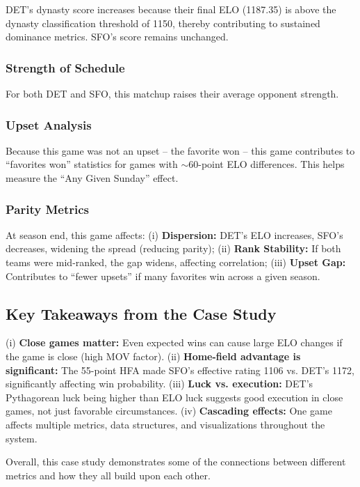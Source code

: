 \documentclass[a4paper,10.5pt,twoside]{article}
\begin{document}
DET's dynasty score increases because their final ELO (1187.35) is above the dynasty classification threshold of 1150, thereby contributing to sustained dominance metrics. SFO's score remains unchanged.

\subsubsection{Strength of Schedule}

For both DET and SFO, this matchup raises their average opponent strength. 

\subsubsection{Upset Analysis}

Because this game was not an upset -- the favorite won -- this game contributes to ``favorites won'' statistics for games with $\sim 60$-point ELO differences. This helps measure the ``Any Given Sunday'' effect.

\subsubsection{Parity Metrics}

At season end, this game affects:  
(i) \textbf{Dispersion:} DET's ELO increases, SFO's decreases, widening the spread (reducing parity);  
(ii) \textbf{Rank Stability:} If both teams were mid-ranked, the gap widens, affecting correlation;  
(iii) \textbf{Upset Gap:} Contributes to ``fewer upsets'' if many favorites win across a given season.

\subsection{Key Takeaways from the Case Study}

(i) \textbf{Close games matter:} Even expected wins can cause large ELO changes if the game is close (high MOV factor).  
(ii) \textbf{Home-field advantage is significant:} The 55-point HFA made SFO’s effective rating 1106 vs. DET’s 1172, significantly affecting win probability.  
(iii) \textbf{Luck vs. execution:} DET’s Pythagorean luck being higher than ELO luck suggests good execution in close games, not just favorable circumstances.  
(iv) \textbf{Cascading effects:} One game affects multiple metrics, data structures, and visualizations throughout the system.  

Overall, this case study demonstrates some of the connections between different metrics and how they all build upon each other.
\end{document}
